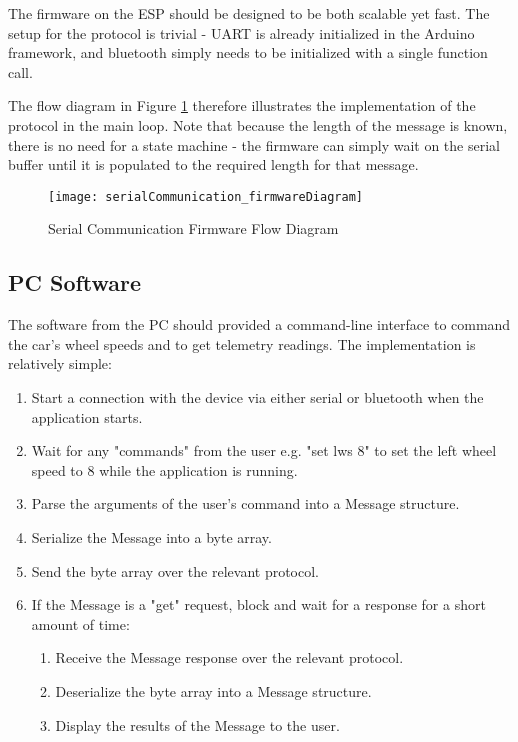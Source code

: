 The firmware on the ESP should be designed to be both scalable yet fast. The setup for the protocol is trivial - UART is already
initialized in the Arduino framework, and bluetooth simply needs to be initialized with a single function call.

The flow diagram in Figure \ref{fig:serialCommunication_firmwareDiagram} therefore illustrates the implementation of the protocol
in the main loop. Note that because the length of the message is known, there is no need for a state machine - the firmware
can simply wait on the serial buffer until it is populated to the required length for that message.

\begin{figure}[!htb]
  \centering
  \texttt{[image: serialCommunication\_firmwareDiagram]}
  \caption{Serial Communication Firmware Flow Diagram}
  \label{fig:serialCommunication_firmwareDiagram}
\end{figure}

\subsection{PC Software}

The software from the PC should provided a command-line interface to command the car's wheel speeds and to get telemetry readings.
The implementation is relatively simple:

\begin{enumerate}
  \item Start a connection with the device via either serial or bluetooth when the application starts.
  \item Wait for any "commands" from the user e.g. "set lws 8" to set the left wheel speed to 8 while the application is running.
  \item Parse the arguments of the user's command into a Message structure.
  \item Serialize the Message into a byte array.
  \item Send the byte array over the relevant protocol.
  \item If the Message is a "get" request, block and wait for a response for a short amount of time:
  \begin{enumerate}
    \item Receive the Message response over the relevant protocol.
    \item Deserialize the byte array into a Message structure.
    \item Display the results of the Message to the user.
  \end{enumerate}
\end{enumerate}